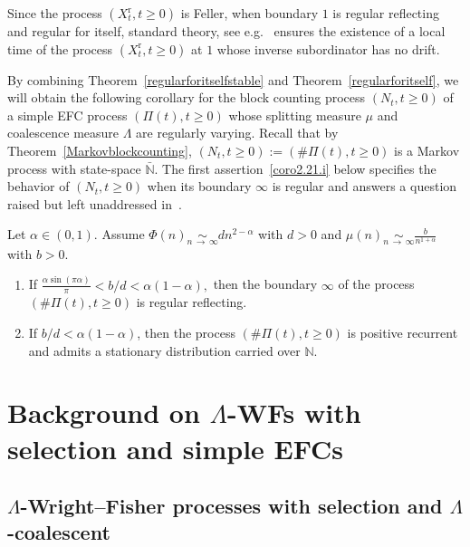 \documentclass[AHL,Unicode,longabstracts,published]{cedram}
\newcommand{\rmr}{\mathrm{r}}
\newcommand{\bbN}{\mathbb{N}}
\newcommand*{\romanenumi}{\renewcommand*{\theenumi}{\roman{enumi}}}
\begin{document}
\begin{rema}
Since the process $(X_t^{\rmr},t\geq 0)$ is Feller, when boundary $1$ is regular reflecting and regular for itself, standard theory, see e.g.~\cite[Chapter~IV]{Bertoin96} ensures the existence of a local time of the process $(X_t^{\rmr},t\geq 0)$ at $1$ whose inverse subordinator has no drift.
\end{rema}

By combining Theorem~\ref{regularforitselfstable} and Theorem~\ref{regularforitself}, we will obtain the following corollary for the block counting process $(N_t,t\geq 0)$ of a simple EFC process $(\Pi(t),t\geq 0)$ whose splitting measure $\mu$ and coalescence measure $\Lambda$ are regularly varying. Recall that by Theorem~\ref{Markovblockcounting}, $(N_t,t\geq 0):=(\#\Pi(t),t\geq 0)$ is a Markov process with state-space $\bar{\bbN}$. The first assertion~\eqref{coro2.21.i} below specifies the behavior of $(N_t,t\geq 0)$ when its boundary $\infty$ is regular and answers a question raised but left unaddressed in~\cite{explosion}.

\begin{coro}\label{inftyregularreflecting}
Let $\alpha\in (0,1)$. Assume $\Phi(n)\underset{n\,\rightarrow\,\infty}{\sim} dn^{2-\alpha}$ with $d>0$ and $\mu(n)\underset{n\,\rightarrow\,\infty}{\sim} \frac{b}{n^{1+\alpha}}$ with $b>0$.
\begin{enumerate}\romanenumi
\item\label{coro2.21.i} If $\frac{\alpha \sin(\pi \alpha)}{\pi}<b/d<\alpha(1-\alpha),$ then the boundary $\infty$ of the process $(\#\Pi(t),t\geq 0)$ is regular reflecting.
\item\label{coro2.21.ii} If $b/d<\alpha(1-\alpha)$, then the process $(\#\Pi(t),t\geq 0)$ is positive recurrent and admits a stationary distribution carried over $\bbN$.
\end{enumerate}
\end{coro}



\section{Background on \texorpdfstring{$\Lambda$}{Lambda}-WFs with selection and simple EFCs}\label{background}

\subsection{\texorpdfstring{$\Lambda$}{Lambda}-Wright--Fisher processes with selection and \texorpdfstring{$\Lambda$}{Lambda}-coalescent}\label{backgroundWF}
\end{document}
